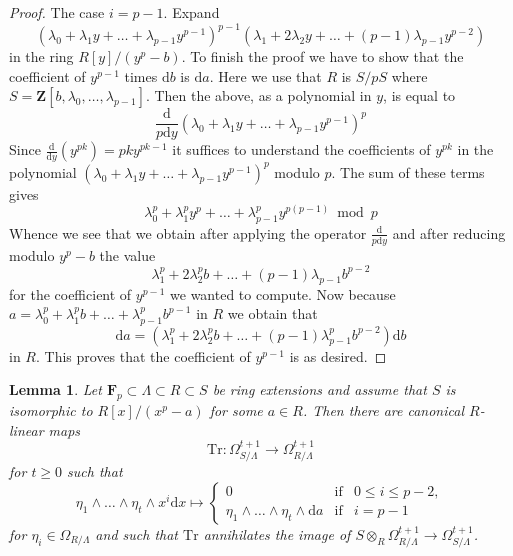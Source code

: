 \documentclass{stacks-project}
\theoremstyle{plain}
\newtheorem{lemma}[subsection]{Lemma}
\theoremstyle{definition}
\theoremstyle{remark}
\numberwithin{equation}{subsection}
\begin{document}
\begin{proof}
\medskip\noindent
The case $i = p - 1$. Expand
$$
(\lambda_0 + \lambda_1 y + \ldots + \lambda_{p - 1}y^{p - 1})^{p - 1}
(\lambda_1 + 2 \lambda_2 y + \ldots + (p - 1)\lambda_{p - 1}y^{p - 2})
$$
in the ring $R[y]/(y^p - b)$. To finish the proof we have to show that
the coefficient of $y^{p - 1}$ times $\text{d}b$ is $\text{d}a$.
Here we use that $R$ is $S/pS$ where
$S = \mathbf{Z}[b, \lambda_0, \ldots, \lambda_{p - 1}]$.
Then the above, as a polynomial in $y$, is equal to
$$
\frac{\text{d}}{p\text{d}y}
(\lambda_0 + \lambda_1 y + \ldots + \lambda_{p - 1}y^{p - 1})^p
$$
Since $\frac{\text{d}}{\text{d}y}(y^{pk}) = pk y^{pk - 1}$
it suffices to understand the coefficients of $y^{pk}$ in the polynomial
$(\lambda_0 + \lambda_1 y + \ldots + \lambda_{p - 1}y^{p - 1})^p$
modulo $p$. The sum of these terms gives
$$
\lambda_0^p + \lambda_1^py^p + \ldots + \lambda_{p - 1}^py^{p(p - 1)}
\bmod p
$$
Whence we see that we obtain after applying the operator
$\frac{\text{d}}{p\text{d}y}$ and after reducing modulo $y^p - b$
the value
$$
\lambda_1^p + 2\lambda_2^pb + \ldots + (p - 1)\lambda_{p - 1}b^{p - 2}
$$
for the coefficient of $y^{p - 1}$ we wanted to compute. Now because
$a = \lambda_0^p + \lambda_1^p b + \ldots + \lambda_{p - 1}^pb^{p - 1}$
in $R$ we obtain that
$$
\text{d}a = (\lambda_1^p  + 2 \lambda_2^p b + \ldots +
(p - 1) \lambda_{p - 1}^p b^{p - 2}) \text{d}b
$$
in $R$. This proves that the coefficient of $y^{p - 1}$ is as desired.
\end{proof}

\begin{lemma}
\label{lemma-trace-higher}
Let $\mathbf{F}_p \subset \Lambda \subset R \subset S$ be ring extensions
and assume that $S$ is isomorphic to $R[x]/(x^p - a)$ for some $a \in R$.
Then there are canonical $R$-linear maps
$$
\text{Tr} :
\Omega^{t + 1}_{S/\Lambda}
\longrightarrow
\Omega_{R/\Lambda}^{t + 1}
$$
for $t \geq 0$ such that
$$
\eta_1 \wedge \ldots \wedge \eta_t \wedge x^i\text{d}x
\longmapsto
\left\{
\begin{matrix}
0 & \text{if} & 0 \leq i \leq p - 2, \\
\eta_1 \wedge \ldots \wedge \eta_t \wedge \text{d}a & \text{if} & i = p - 1
\end{matrix}
\right.
$$
for $\eta_i \in \Omega_{R/\Lambda}$ and such that $\text{Tr}$ annihilates the
image of
$S \otimes_R \Omega_{R/\Lambda}^{t + 1} \to \Omega_{S/\Lambda}^{t + 1}$.
\end{lemma}
\end{document}
